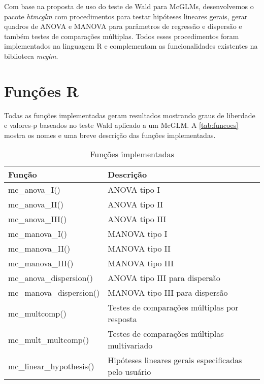 Com base na proposta de uso do teste de Wald para McGLMs, desenvolvemos o pacote \emph{htmcglm} com procedimentos para testar hipóteses lineares gerais, gerar quadros de ANOVA e MANOVA para parâmetros de regressão e dispersão e também testes de comparações múltiplas. Todos esses procedimentos foram implementados na linguagem R e complementam as funcionalidades existentes na biblioteca \emph{mcglm}.


\section{Funções R}

Todas as funções implementadas geram resultados mostrando graus de liberdade e valores-p baseados no teste Wald aplicado a um McGLM. A \autoref{tab:funcoes} mostra os nomes e uma breve descrição das funções implementadas.

\begin{table}[h]
\centering
\begin{tabular}{ll}
\hline
Função                   & Descrição \\ 
\hline

mc\_anova\_I()           & ANOVA  tipo I \\
mc\_anova\_II()          & ANOVA  tipo II \\
mc\_anova\_III()         & ANOVA  tipo III \\

mc\_manova\_I()          & MANOVA tipo I \\
mc\_manova\_II()         & MANOVA tipo II \\
mc\_manova\_III()        & MANOVA tipo III \\

mc\_anova\_dispersion()        & ANOVA  tipo III para dispersão \\
mc\_manova\_dispersion()       & MANOVA tipo III para dispersão \\

mc\_multcomp()           & Testes de comparações múltiplas por resposta \\

mc\_mult\_multcomp()     & Testes de comparações múltiplas multivariado \\

mc\_linear\_hypothesis() & Hipóteses lineares gerais especificadas pelo usuário \\

\hline
\end{tabular}
\caption{Funções implementadas}
\label{tab:funcoes}
\end{table}

